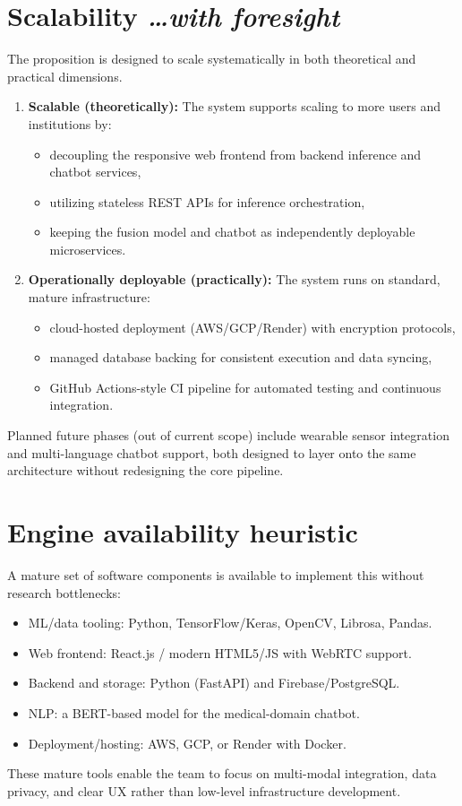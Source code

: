 \documentclass[11pt,a4paper]{article}
\newcommand{\BvrHint}[1]{%
  {\normalfont\normalsize\itshape\hfill #1}}
\begin{document}
\section{Scalability %
\BvrHint{\ldots with foresight}}
The proposition is designed to scale systematically in both theoretical and practical dimensions.

\begin{enumerate}[leftmargin=0.7cm]
    \item \textbf{Scalable (theoretically):} The system supports scaling to more users and institutions by:
    \begin{itemize}[leftmargin=0.7cm]
        \item decoupling the responsive web frontend from backend inference and chatbot services,
        \item utilizing stateless REST APIs for inference orchestration,
        \item keeping the fusion model and chatbot as independently deployable microservices.
    \end{itemize}
    
    \item \textbf{Operationally deployable (practically):} The system runs on standard, mature infrastructure:
    \begin{itemize}[leftmargin=0.7cm]
        \item cloud-hosted deployment (AWS/GCP/Render) with encryption protocols,
        \item managed database backing for consistent execution and data syncing,
        \item GitHub Actions-style CI pipeline for automated testing and continuous integration.
    \end{itemize}
\end{enumerate}
Planned future phases (out of current scope) include wearable sensor integration and multi-language chatbot support, both designed to layer onto the same architecture without redesigning the core pipeline.

\section{Engine availability heuristic}
A mature set of software components is available to implement this without research bottlenecks:
\begin{itemize}[leftmargin=0.7cm]
    \item ML/data tooling: Python, TensorFlow/Keras, OpenCV, Librosa, Pandas.
    \item Web frontend: React.js / modern HTML5/JS with WebRTC support.
    \item Backend and storage: Python (FastAPI) and Firebase/PostgreSQL.
    \item NLP: a BERT-based model for the medical-domain chatbot.
    \item Deployment/hosting: AWS, GCP, or Render with Docker.
\end{itemize}
These mature tools enable the team to focus on multi-modal integration, data privacy, and clear UX rather than low-level infrastructure development.
\end{document}
